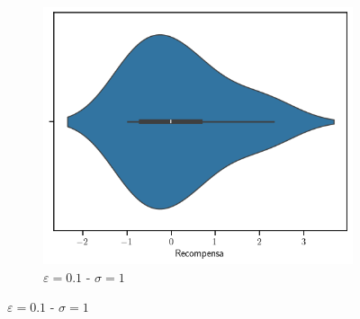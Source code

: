 \documentclass[12pt]{article}
\begin{document}
\begin{figure}[]
\begin{subfigure}[H]{0.3\textwidth}
        \end{subfigure}
        \begin{subfigure}[H]{0.3\textwidth}
            \includegraphics[width=\textwidth]{../img/values_sigma_1_epsilon_0.1}
            \caption{$\varepsilon=0.1$ - $\sigma=1$}
            \label{fig:estimations_5}
        \end{subfigure}


\end{figure}
\end{document}
